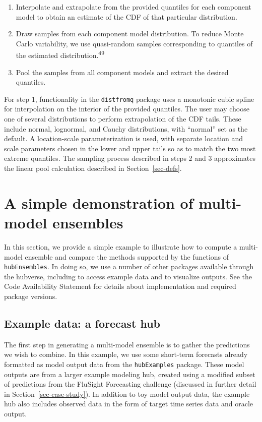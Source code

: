 \documentclass[
]{article}
\providecommand{\tightlist}{%
  \setlength{\itemsep}{0pt}\setlength{\parskip}{0pt}}\usepackage{longtable,booktabs,array}
\begin{document}
\begin{enumerate}
\def\labelenumi{\arabic{enumi}.}
\tightlist
\item
  Interpolate and extrapolate from the provided quantiles for each
  component model to obtain an estimate of the CDF of that particular
  distribution.
\item
  Draw samples from each component model distribution. To reduce Monte
  Carlo variability, we use quasi-random samples corresponding to
  quantiles of the estimated distribution.\textsuperscript{49}
\item
  Pool the samples from all component models and extract the desired
  quantiles.
\end{enumerate}

For step 1, functionality in the \texttt{distfromq} package uses a
monotonic cubic spline for interpolation on the interior of the provided
quantiles. The user may choose one of several distributions to perform
extrapolation of the CDF tails. These include normal, lognormal, and
Cauchy distributions, with ``normal'' set as the default. A
location-scale parameterization is used, with separate location and
scale parameters chosen in the lower and upper tails so as to match the
two most extreme quantiles. The sampling process described in steps 2
and 3 approximates the linear pool calculation described in
Section~\ref{sec-defs}.

\section{A simple demonstration of multi-model
ensembles}\label{sec-simple-ex}

In this section, we provide a simple example to illustrate how to
compute a multi-model ensemble and compare the methods supported by the
functions of \texttt{hubEnsembles}. In doing so, we use a number of
other packages available through the hubverse, including to access
example data and to visualize outputs. See the Code Availability
Statement for details about implementation and required package
versions.

\subsection{Example data: a forecast
hub}\label{example-data-a-forecast-hub}

The first step in generating a multi-model ensemble is to gather the
predictions we wish to combine. In this example, we use some short-term
forecasts already formatted as model output data from the
\texttt{hubExamples} package. These model outputs are from a larger
example modeling hub, created using a modified subset of predictions
from the FluSight Forecasting challenge (discussed in further detail in
Section~\ref{sec-case-study}). In addition to toy model output data, the
example hub also includes observed data in the form of target time
series data and oracle output.
\end{document}
